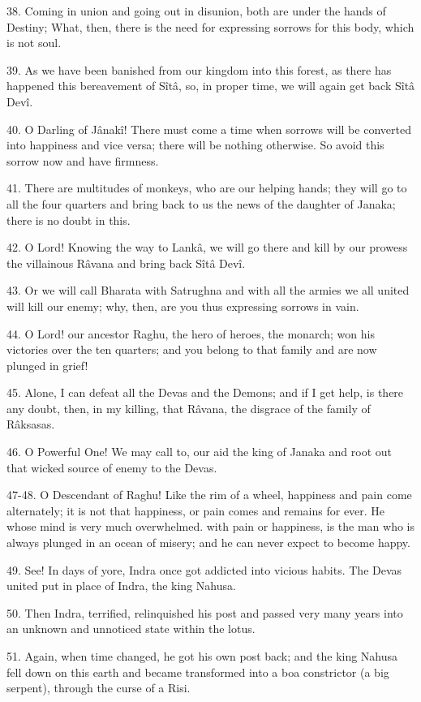 38. Coming in union and going out in disunion, both are under the hands of Destiny; What, then, there is the need for expressing sorrows for this body, which is not soul.

39. As we have been banished from our kingdom into this forest, as there has happened this bereavement of S\^it\^a, so, in proper time, we will again get back S\^it\^a Dev\^i.

40. O Darling of J\^anak\^i! There must come a time when sorrows will be converted into happiness and vice versa; there will be nothing otherwise. So avoid this sorrow now and have firmness.

41. There are multitudes of monkeys, who are our helping hands; they will go to all the four quarters and bring back to us the news of the daughter of Janaka; there is no doubt in this.

42. O Lord! Knowing the way to Lank\^a, we will go there and kill by our prowess the villainous R\^avana and bring back S\^it\^a Dev\^i.

43. Or we will call Bharata with Satrughna and with all the armies we all united will kill our enemy; why, then, are you thus expressing sorrows in vain.

44. O Lord! our ancestor Raghu, the hero of heroes, the monarch; won his victories over the ten quarters; and you belong to that family and are now plunged in grief!

45. Alone, I can defeat all the Devas and the Demons; and if I get help, is there any doubt, then, in my killing, that R\^avana, the disgrace of the family of R\^aksasas.

46. O Powerful One! We may call to, our aid the king of Janaka and root out that wicked source of enemy to the Devas.

47-48. O Descendant of Raghu! Like the rim of a wheel, happiness and pain come alternately; it is not that happiness, or pain comes and remains for ever. He whose mind is very much overwhelmed. with pain or happiness, is the man who is always plunged in an ocean of misery; and he can never expect to become happy.

49. See! In days of yore, Indra once got addicted into vicious habits. The Devas united put in place of Indra, the king Nahusa.

50. Then Indra, terrified, relinquished his post and passed very many years into an unknown and unnoticed state within the lotus.

51. Again, when time changed, he got his own post back; and the king Nahusa fell down on this earth and became transformed into a boa constrictor (a big serpent), through the curse of a Risi.

